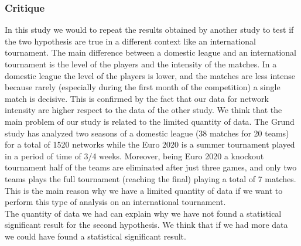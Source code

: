 \documentclass[12pt, a4paper]{article}
\begin{document}
\subsubsection{Critique}
\label{critique}
In this study we would to repeat the results obtained by another study \cite{GRUND} to test if the two hypothesis are true in a different context like an international tournament. The main difference between a domestic league and an international tournament is the level of the players and the intensity of the matches. In a domestic league the level of the players is lower, and the matches are less intense because rarely (especially during the first month of the competition) a single match is decisive. This is confirmed by the fact that our data for network intensity are higher respect to the data of the other study. 
We think that the main problem of our study is related to the limited quantity of data. The Grund study has analyzed two seasons of a domestic league (38 matches for 20 teams) for a total of 1520 networks while the Euro 2020 is a summer tournament played in a period of time of 3/4 weeks. Moreover, being Euro 2020 a knockout tournament half of the teams are eliminated after just three games, and only two teams plays the full tournament (reaching the final) playing a total of 7 matches. This is the main reason why we have a limited quantity of data if we want to perform this type of analysis on an international tournament. \\
The quantity of data we had can explain why we have not found a statistical significant result for the second hypothesis. We think that if we had more data we could have found a statistical significant result. \\ 





\nocite{*}
\end{document}
